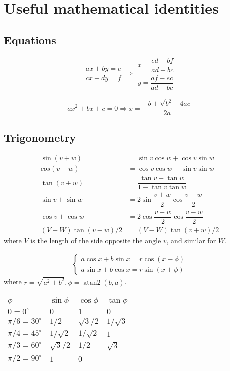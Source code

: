 
\chapter{Useful mathematical identities}

\section{Equations}
\[\begin{aligned}ax+by=e\\cx+dy=f\end{aligned}
\Rightarrow
\begin{aligned}x=\dfrac{ed-bf}{ad-bc}\\y=\dfrac{af-ec}{ad-bc}\end{aligned}\]

\[ax^2+bx+c=0 \Rightarrow x = \frac{-b\pm\sqrt{b^2-4ac}}{2a}\]

\section{Trigonometry}
\begin{align*}
\sin(v+w)&{}=\sin v\cos w+\cos v\sin w\\
cos(v+w)&{}=\cos v\cos w-\sin v\sin w\\
\tan(v+w)&{}=\dfrac{\tan v+\tan w}{1-\tan v\tan w}\\
\sin v+\sin w&{}=2\sin\dfrac{v+w}{2}\cos\dfrac{v-w}{2}\\
\cos v+\cos w&{}=2\cos\dfrac{v+w}{2}\cos\dfrac{v-w}{2}\\
(V+W)\tan(v-w)/2&{}=(V-W)\tan(v+w)/2
\end{align*}
where $V$ is the length of the side opposite the angle $v$, and
similar for $W$.

\begin{align*}
\begin{cases}
a\cos x+b\sin x=r\cos(x-\phi)\\
a\sin x+b\cos x=r\sin(x+\phi)
\end{cases}
\end{align*}
where $r=\sqrt{a^2+b^2}, \phi=\operatorname{atan2}(b,a)$.

\begin{center}
\begin{tabular}{|l|l|l|l|}
\hline
$\phi$ & $\sin\phi$ & $\cos\phi$ & $\tan\phi$ \\
\hline
$0 = 0^\circ$ & $0$ & $1$ & $0$\\
\hline
$\pi/6 = 30^\circ$ & $1/2$ & $\sqrt3/2$ & $1/\sqrt3$\\
\hline
$\pi/4 = 45^\circ$ & $1/\sqrt2$ & $1/\sqrt2$ & $1$\\
\hline
$\pi/3 = 60^\circ$ & $\sqrt3/2$ & $1/2$ & $\sqrt3$\\
\hline
$\pi/2 = 90^\circ$ & $1$ & $0$ & --\\
\hline
\end{tabular}
\end{center}

